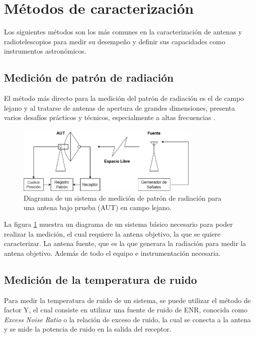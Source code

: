 \section{Métodos de caracterización}

Los siguientes métodos son los más comunes en la caracterización de antenas y radiotelescopios para medir su desempeño y definir sus capacidades como instrumentos astronómicos.\\

\subsection{Medición de patrón de radiación}

El método más directo para la medición del patrón de radiación es el de campo lejano y al tratarse de antenas de apertura de grandes dimensiones, presenta varios desafíos prácticos y técnicos, especialmente a altas frecuencias \cite{Astudillo2014}.\\

\begin{figure}
    \centering
    \includegraphics[width = 0.8\textwidth]{img/farfielddiag}
    \caption{Diagrama de un sistema de medición de patrón de radiación para una antena bajo prueba (AUT) en campo lejano.}
    \label{fig:farfield}
\end{figure}

La figura \ref{fig:farfield} muestra un diagrama de un sistema básico necesario para poder realizar la medición, el cual requiere la antena objetivo, la que se quiere caracterizar. La antena fuente, que es la que generara la radiación para medir la antena objetivo. Además de todo el equipo e instrumentación necesaria.\\

\subsection{Medición de la temperatura de ruido}

Para medir la temperatura de ruido de un sistema, se puede utilizar el método de factor Y, el cual consiste en utilizar una fuente de ruido de ENR, conocida como \textit{Excess Noise Ratio} o la relación de exceso de ruido, la cual se conecta a la antena y se mide la potencia de ruido en la salida del receptor.\\

